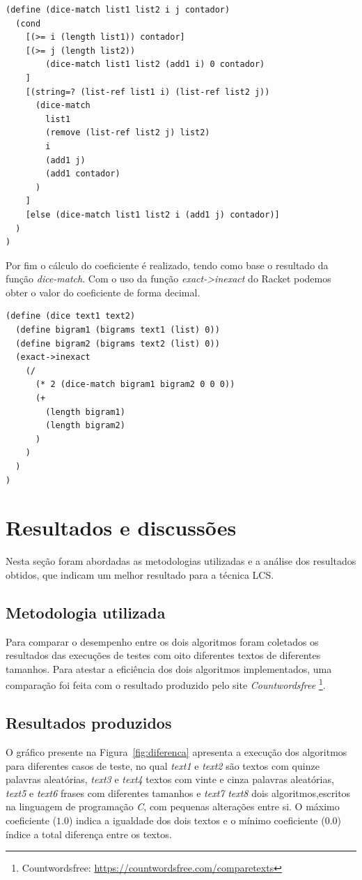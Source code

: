 \documentclass[12pt]{article}
\begin{document}
\begin{lstlisting}
(define (dice-match list1 list2 i j contador)
  (cond
    [(>= i (length list1)) contador]
    [(>= j (length list2))
        (dice-match list1 list2 (add1 i) 0 contador)
    ]
    [(string=? (list-ref list1 i) (list-ref list2 j)) 
      (dice-match
        list1
        (remove (list-ref list2 j) list2)
        i
        (add1 j)
        (add1 contador)
      )
    ]
    [else (dice-match list1 list2 i (add1 j) contador)]
  )
)
\end{lstlisting}

Por fim o cálculo do coeficiente é realizado, tendo como base o resultado da função \textit{dice-match}. Com o uso da função \textit{exact->inexact} do Racket podemos obter o valor do coeficiente de forma decimal.

\begin{lstlisting}
(define (dice text1 text2)
  (define bigram1 (bigrams text1 (list) 0))
  (define bigram2 (bigrams text2 (list) 0))
  (exact->inexact
    (/ 
      (* 2 (dice-match bigram1 bigram2 0 0 0))
      (+ 
        (length bigram1)
        (length bigram2)
      )
    )
  )
)
\end{lstlisting}

\section{Resultados e discussões}

Nesta seção foram abordadas as metodologias utilizadas e a análise dos resultados obtidos, que indicam um melhor resultado para a técnica LCS.

\subsection{Metodologia utilizada}

Para comparar o desempenho entre os dois algoritmos foram coletados os resultados das execuções de testes com oito diferentes textos de diferentes tamanhos. Para atestar a eficiência dos dois algoritmos implementados, uma comparação foi feita com o resultado produzido pelo site \textit{Countwordsfree} \footnote{Countwordsfree: \url{https://countwordsfree.com/comparetexts}}.

\subsection{Resultados produzidos}

O gráfico presente na Figura~\ref{fig:diferenca} apresenta a execução dos algoritmos para diferentes casos de teste, no qual \textit{text1} e \textit{text2} são textos com quinze palavras aleatórias, \textit{text3} e \textit{text4} textos com vinte e cinza palavras aleatórias, \textit{text5} e \textit{text6} frases com diferentes tamanhos e \textit{text7} \textit{text8} dois algoritmos,escritos na linguagem de programação \textit{C}, com pequenas alterações entre si. O máximo coeficiente ($1.0$) indica a igualdade dos dois textos e o mínimo coeficiente ($0.0$) índice a total diferença entre os textos.
\end{document}
